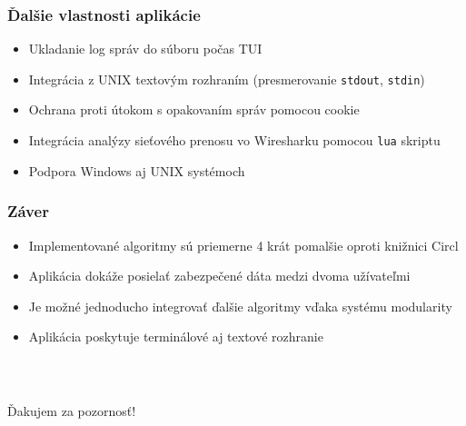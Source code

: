 \documentclass[%
  14pt,       				%
	t,                  %
	aspectratio=1610,   %
	unicode,						%
]{beamer}				    	%
\begin{document}
\begin{frame}[c]
	\frametitle{Ďalšie vlastnosti aplikácie}
	\large{\begin{itemize}
			\item Ukladanie log správ do súboru počas TUI
			\item Integrácia z UNIX textovým rozhraním (presmerovanie \texttt{stdout}, \texttt{stdin})
			\item Ochrana proti útokom s opakovaním správ pomocou cookie
			\item Integrácia analýzy sieťového prenosu vo Wiresharku pomocou \texttt{lua} skriptu
			\item Podpora Windows aj UNIX systémoch
		\end{itemize}}
\end{frame}

\begin{frame}[c]
	\frametitle{Záver}
	\large{\begin{itemize}
			\item Implementované algoritmy sú priemerne 4 krát pomalšie oproti knižnici Circl
			\item Aplikácia dokáže posielať zabezpečené dáta medzi dvoma užívateľmi
			\item Je možné jednoducho integrovať ďalšie algoritmy vďaka systému modularity
			\item Aplikácia poskytuje terminálové aj textové rozhranie
		\end{itemize}}
\end{frame}


\begin{frame}[c]
	\frametitle{\mbox{ }}
	\begin{center}
		{\Huge Ďakujem za pozornosť!}
	\end{center}
\end{frame}


\end{document}
